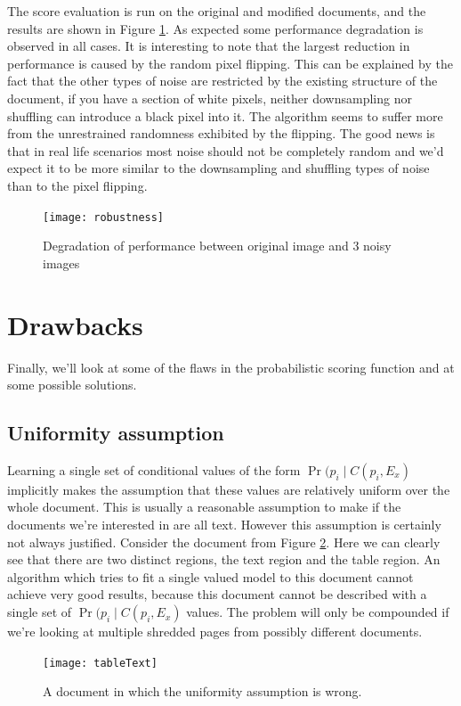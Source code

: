 The score evaluation is run on the original and modified documents, and the results are shown in Figure \ref{fig:robustness}. As expected some performance degradation is observed in all cases. It is interesting to note that the largest reduction in performance is caused by the random pixel flipping. This can be explained by the fact that the other types of noise are restricted by the existing structure of the document, if you have a section of white pixels, neither downsampling nor shuffling can introduce a black pixel into it. The algorithm seems to suffer more from the unrestrained randomness exhibited by the flipping. The good news is that in real life scenarios most noise should not be completely random and we'd expect it to be more similar to the downsampling and shuffling types of noise than to the pixel flipping.

\begin{figure}[h]
\centering
\texttt{[image: robustness]}
\caption{Degradation of performance between original image and 3 noisy images}
\label{fig:robustness}
\end{figure}

\section{Drawbacks}

Finally, we'll look at some of the flaws in the probabilistic scoring function and at some possible solutions.

\subsection{Uniformity assumption}
Learning a single set of conditional values of the form \(\Pr(p_i \mid C(p_i,E_x) \) implicitly makes the assumption that these values are relatively uniform over the whole document. This is usually a reasonable assumption to make if the documents we're interested in are all text. However this assumption is certainly not always justified. Consider the document from Figure \ref{fig:tableText}. Here we can clearly see that there are two distinct regions, the text region and the table region. An algorithm which tries to fit a single valued model to this document cannot achieve very good results, because this document cannot be described with a single set of \(\Pr(p_i \mid C(p_i,E_x) \) values. The problem will only be compounded if we're looking at multiple shredded pages from possibly different documents.

\begin{figure}[h]
\centering
\texttt{[image: tableText]}
\caption{A document in which the uniformity assumption is wrong.}
\label{fig:tableText}
\end{figure}

